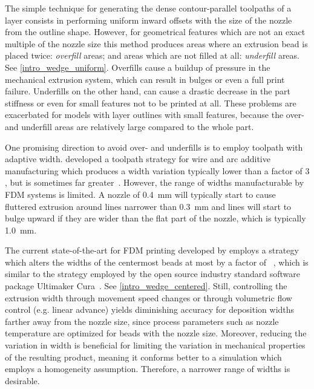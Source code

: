 The simple technique for generating the dense contour-parallel toolpaths of a layer consists in performing uniform inward offsets with the size of the nozzle from the outline shape.
However, for geometrical features which are not an exact multiple of the nozzle size this method produces areas where an extrusion bead is placed twice: \emph{overfill} areas; and areas which are not filled at all: \emph{underfill} areas.
See \cref{intro_wedge_uniform}.
Overfills cause a buildup of pressure in the mechanical extrusion system, which can result in bulges or even a full print failure.
Underfills on the other hand, can cause a drastic decrease in the part stiffness or even for small features not to be printed at all.
These problems are exacerbated for models with layer outlines with small features, because the over- and underfill areas are relatively large compared to the whole part.

One promising direction to avoid over- and underfills is to employ toolpath with adaptive width.
\citeauthor{Ding2016a} developed a toolpath strategy for wire and arc additive manufacturing which produces a width variation typically lower than a factor of $3$, but is sometimes far greater~\cite{Ding2016a,Xiong2019}.
However, the range of widths manufacturable by FDM systems is limited.
A nozzle of \SI{0.4}{\milli\meter} will typically start to cause fluttered extrusion around lines narrower than \SI{0.3}{\milli\meter} and lines will start to bulge upward if they are wider than the flat part of the nozzle, which is typically \SI{1.0}{\milli\meter}.

The current state-of-the-art for FDM printing developed by \citeauthor{Jin2017JMS} employs a strategy which alters the widths of the centermost beads at most by a factor of ~\cite{Jin2017JMS},
which is similar to the strategy employed by the open source industry standard software package Ultimaker Cura~\cite{cura}.
See \cref{intro_wedge_centered}.
Still, controlling the extrusion width through movement speed changes or through volumetric flow control (e.g. linear advance) yields diminishing accuracy for deposition widths farther away from the nozzle size,
since process parameters such as nozzle temperature are optimized for beads with the nozzle size.
Moreover, reducing the variation in width is beneficial for limiting the variation in mechanical properties of the resulting product, meaning it conforms better to a simulation which employs a homogeneity assumption.
Therefore, a narrower range of widths is desirable.

